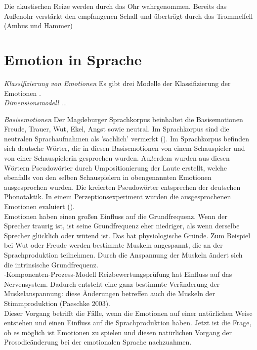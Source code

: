 \documentclass[11pt,a4paper,headsepline,twoside,toc=bibliography]{scrreprt}
\begin{document}
Die akustischen Reize werden durch das Ohr wahrgenommen. Bereits das Außenohr verstärkt den empfangenen Schall und überträgt durch das Trommelfell (Ambus und Hammer) \\


\section{Emotion in Sprache}
\label{sec:emotion_in_speech}



\emph{Klassifizierung von Emotionen}
Es gibt drei Modelle der Klassifizierung der Emotionen \autocite[s. 46]{Wendt2007}. \\

\emph{Dimensionsmodell}
...

\emph{Basisemotionen}
Der Magdeburger Sprachkorpus beinhaltet die Basisemotionen Freude, Trauer, Wut, Ekel, Angst sowie neutral. Im Sprachkorpus sind die neutralen Sprachaufnahmen als 'sachlich' vermerkt (\cite{Wendt2002}). Im Sprachkorpus befinden sich deutsche Wörter, die in diesen Basisemotionen von einem Schauspieler und von einer Schauspielerin gesprochen wurden. Außerdem wurden aus diesen Wörtern Pseudowörter durch Umpositionierung der Laute erstellt, welche ebenfalls von den selben Schauspielern in obengenannten Emotionen ausgesprochen wurden. Die kreierten Pseudowörter entsprechen der deutschen Phonotaktik. In einem Perzeptionsexperiment wurden die ausgesprochenen Emotionen evaluiert (\cite{Wendt2003}). \\

Emotionen haben einen großen Einfluss auf die Grundfrequenz. Wenn der Sprecher traurig ist, ist seine Grundfrequenz eher niedriger, als wenn derselbe Sprecher glücklich oder wütend ist. Das hat physiologische Gründe. Zum Beispiel bei Wut oder Freude werden bestimmte Muskeln angespannt, die an der Sprachproduktion teilnehmen. Durch die Anspannung der Muskeln ändert sich die intrinsische Grundfrequenz. \\

-Komponenten-Prozess-Modell 
Reizbewertungsprüfung hat Einfluss auf das Nervensystem. Dadurch entsteht eine ganz bestimmte Veränderung der Muskelanspannung: diese Änderungen betreffen auch die Muskeln der Stimmproduktion (Paeschke 2003).\\

Dieser Vorgang betrifft die Fälle, wenn die Emotionen auf einer natürlichen Weise entstehen und einen Einfluss auf die Sprachproduktion haben. Jetzt ist die Frage, ob es möglich ist Emotionen zu spielen und diesen natürlichen Vorgang der Prosodieänderung bei der emotionalen Sprache nachzuahmen. 
\end{document}
